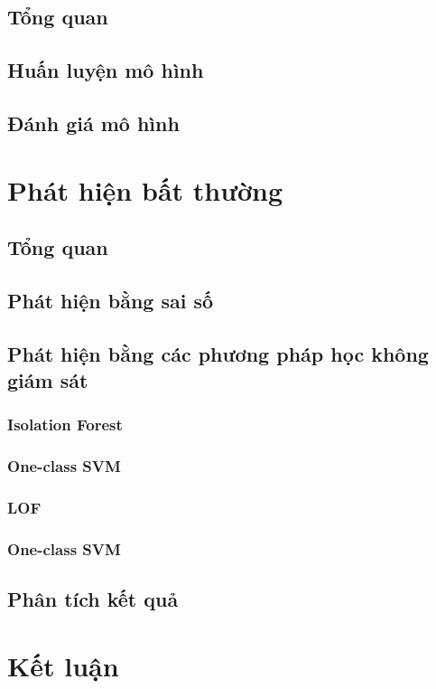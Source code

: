 \subsection{Tổng quan}
\subsection{Huấn luyện mô hình}
\subsection{Đánh giá mô hình}

\section{Phát hiện bất thường}
\subsection{Tổng quan}
\subsection{Phát hiện bằng sai số}
\subsection{Phát hiện bằng các phương pháp học không giám sát}
\subsubsection{Isolation Forest}
\subsubsection{One-class SVM}
\subsubsection{LOF}
\subsubsection{One-class SVM}
\subsection{Phân tích kết quả}


\section{Kết luận}

